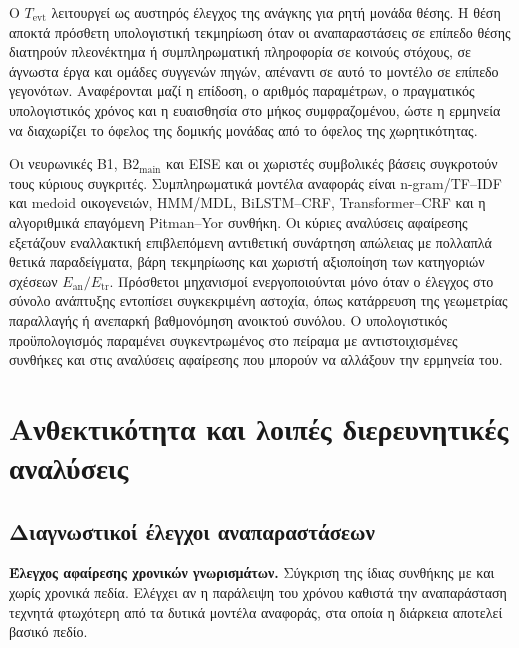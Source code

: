 \documentclass[11pt,a4paper]{article}
\begin{document}
Ο $T_{\mathrm{evt}}$ λειτουργεί ως αυστηρός έλεγχος της ανάγκης για ρητή μονάδα θέσης. Η θέση αποκτά πρόσθετη υπολογιστική τεκμηρίωση όταν οι αναπαραστάσεις σε επίπεδο θέσης διατηρούν πλεονέκτημα ή συμπληρωματική πληροφορία σε κοινούς στόχους, σε άγνωστα έργα και ομάδες συγγενών πηγών, απέναντι σε αυτό το μοντέλο σε επίπεδο γεγονότων. Αναφέρονται μαζί η επίδοση, ο αριθμός παραμέτρων, ο πραγματικός υπολογιστικός χρόνος και η ευαισθησία στο μήκος συμφραζομένου, ώστε η ερμηνεία να διαχωρίζει το όφελος της δομικής μονάδας από το όφελος της χωρητικότητας.


Οι νευρωνικές B1, $\mathrm{B2}_{\mathrm{main}}$ και EISE και οι χωριστές συμβολικές βάσεις συγκροτούν τους κύριους συγκριτές. Συμπληρωματικά μοντέλα αναφοράς είναι n-gram/TF--IDF και medoid οικογενειών, HMM/MDL, BiLSTM--CRF, Transformer--CRF και η αλγοριθμικά επαγόμενη Pitman--Yor συνθήκη. Οι κύριες αναλύσεις αφαίρεσης εξετάζουν εναλλακτική επιβλεπόμενη αντιθετική συνάρτηση απώλειας με πολλαπλά θετικά παραδείγματα, βάρη τεκμηρίωσης και χωριστή αξιοποίηση των κατηγοριών σχέσεων $E_{\mathrm{an}}/E_{\mathrm{tr}}$. Πρόσθετοι μηχανισμοί ενεργοποιούνται μόνο όταν ο έλεγχος στο σύνολο ανάπτυξης εντοπίσει συγκεκριμένη αστοχία, όπως κατάρρευση της γεωμετρίας παραλλαγής ή ανεπαρκή βαθμονόμηση ανοικτού συνόλου. Ο υπολογιστικός προϋπολογισμός παραμένει συγκεντρωμένος στο πείραμα με αντιστοιχισμένες συνθήκες και στις αναλύσεις αφαίρεσης που μπορούν να αλλάξουν την ερμηνεία του.


\section{Ανθεκτικότητα και λοιπές διερευνητικές αναλύσεις}\label{app:robust}

\subsection{Διαγνωστικοί έλεγχοι αναπαραστάσεων}\label{app:robust-repr}

\textbf{Έλεγχος αφαίρεσης χρονικών γνωρισμάτων.} Σύγκριση της ίδιας συνθήκης με και χωρίς χρονικά πεδία. Ελέγχει αν η παράλειψη του χρόνου καθιστά την αναπαράσταση τεχνητά φτωχότερη από τα δυτικά μοντέλα αναφοράς, στα οποία η διάρκεια αποτελεί βασικό πεδίο.
\end{document}
